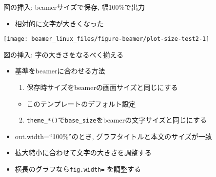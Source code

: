 \documentclass[
  12pt,
  ignorenonframetext,
]{beamer}
\providecommand{\tightlist}{%
  \setlength{\itemsep}{0pt}\setlength{\parskip}{0pt}}
\begin{document}
\begin{frame}{図の挿入: beamerサイズで保存, 幅100\%で出力}
\protect\hypertarget{ux56f3ux306eux633fux5165-beamerux30b5ux30a4ux30baux3067ux4fddux5b58-ux5e45100ux3067ux51faux529b}{}

\begin{itemize}
\tightlist
\item
  相対的に文字が大きくなった
\end{itemize}

\begin{center}\texttt{[image: beamer\_linux\_files/figure-beamer/plot-size-test2-1]} \end{center}

\end{frame}

\begin{frame}[fragile]{図の挿入: 字の大きさをなるべく揃える}
\protect\hypertarget{ux56f3ux306eux633fux5165-ux5b57ux306eux5927ux304dux3055ux3092ux306aux308bux3079ux304fux63c3ux3048ux308b}{}

\begin{itemize}
\tightlist
\item
  基準をbeamerに合わせる方法

  \begin{enumerate}
  \tightlist
  \item
    保存時サイズをbeamerの画面サイズと同じにする
  \end{enumerate}

  \begin{itemize}
  \tightlist
  \item
    このテンプレートのデフォルト設定
  \end{itemize}

  \begin{enumerate}
  \setcounter{enumi}{1}
  \tightlist
  \item
    \texttt{theme\_*()}で\texttt{base\_size}をbeamerの文字サイズと同じにする
  \end{enumerate}
\item
  out.width=``100\%''のとき, グラフタイトルと本文のサイズが一致
\item
  拡大縮小に合わせて文字の大きさを調整する
\item
  横長のグラフなら\texttt{fig.width=} を調整する
\end{itemize}

\end{frame}
\end{document}
